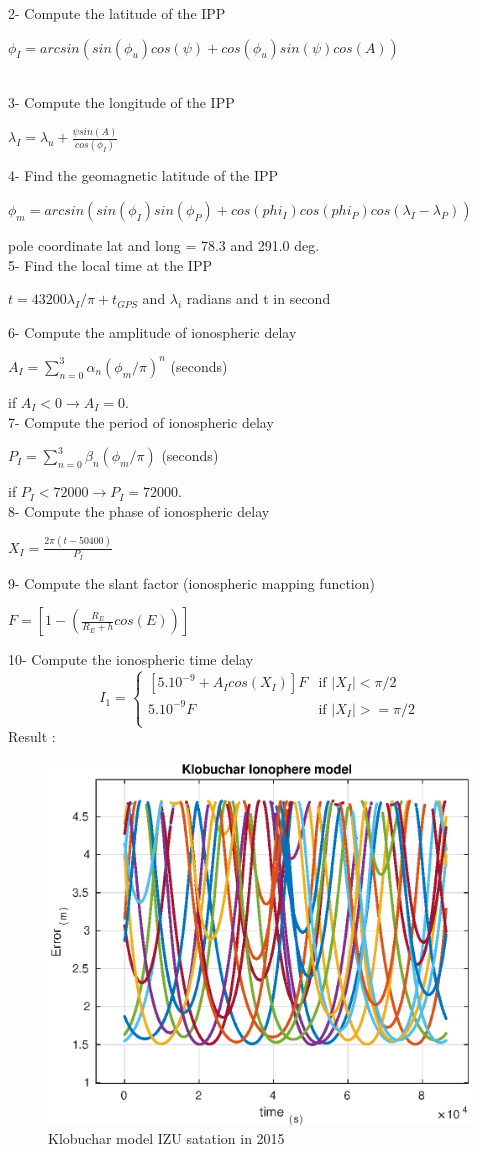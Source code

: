 \documentclass[12pt]{article}
\begin{document}
2- Compute the latitude of the IPP \\
\centerline{$\phi_I = arcsin(sin(\phi_u)cos(\psi) + cos(\phi_u)sin(\psi)cos(A))$}\\
3- Compute the longitude of the IPP\\
\centerline{$\lambda_I = \lambda_u+\frac{\psi sin(A)}{cos(\phi_I)}$}
4- Find the geomagnetic latitude of the IPP\\
\centerline{$\phi_m = arcsin(sin(\phi_I)sin(\phi_P)+cos(phi_I)cos(phi_P)cos(\lambda_I-\lambda_P))$}

pole coordinate lat and long = 78.3 and 291.0 deg.\\
5- Find the local time at the IPP\\
\centerline{$t = 43200 \lambda_I/\pi + {t_{GPS}} $ and $\lambda_i$ radians and t in second} 
6- Compute the amplitude of ionospheric delay\\
\centerline{$A_I = \sum_{n = 0}^{3} \alpha_n(\phi_m/\pi)^n$  (seconds)}
if $A_I < 0 \rightarrow A_I = 0$.\\
7- Compute the period of ionospheric delay\\
\centerline{$P_I = \sum_{n=0}^3 \beta_n(\phi_m/\pi)$ (seconds)}
if $P_I < 72000 \rightarrow P_I = 72000$.\\
8- Compute the phase of ionospheric delay\\
\centerline{$X_I = \frac{2\pi(t-50400)}{P_I}$}
9- Compute the slant factor (ionospheric mapping function)\\
\centerline{$F = [1-(\frac{R_E}{R_E+h}cos(E))]$}
10- Compute the ionospheric time delay
\[
  I_1 = \begin{cases}
    [5.10^{-9} + A_Icos(X_I)]F & \text{if $|X_I| < \pi/2$} \\
    5.10^{-9}F & \text{if $|X_I| >= \pi/2$} \\
  \end{cases}
\]
Result : 
\begin{figure}[H]
	\centering
    \includegraphics[width=0.43 \textwidth]{img/klo}
    \caption{Klobuchar model IZU satation in 2015}
\end{figure}
\newpage
\end{document}
